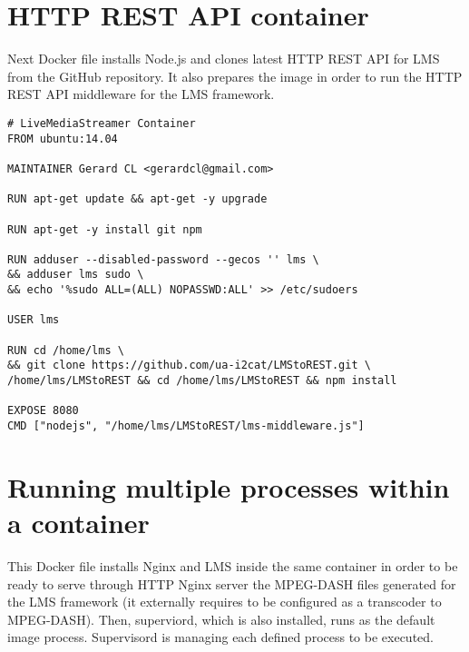 \section{HTTP REST API container}\label{ANX:dockerFiles2}

Next Docker file installs Node.js and clones latest HTTP REST API for LMS from the GitHub repository. It also prepares the image in order to run the HTTP REST API middleware for the LMS framework.

\begin{verbatim}
# LiveMediaStreamer Container
FROM ubuntu:14.04

MAINTAINER Gerard CL <gerardcl@gmail.com>

RUN apt-get update && apt-get -y upgrade

RUN apt-get -y install git npm

RUN adduser --disabled-password --gecos '' lms \
&& adduser lms sudo \
&& echo '%sudo ALL=(ALL) NOPASSWD:ALL' >> /etc/sudoers

USER lms

RUN cd /home/lms \
&& git clone https://github.com/ua-i2cat/LMStoREST.git \
/home/lms/LMStoREST && cd /home/lms/LMStoREST && npm install

EXPOSE 8080
CMD ["nodejs", "/home/lms/LMStoREST/lms-middleware.js"]
\end{verbatim}

\section{Running multiple processes within a container}\label{ANX:dockerFiles3}

This Docker file installs Nginx and LMS inside the same container in order to be ready to serve through HTTP Nginx server the MPEG-DASH files generated for the LMS framework (it externally requires to be configured as a transcoder to MPEG-DASH). Then, superviord, which is also installed, runs as the default image process. Supervisord is managing each defined process to be executed.  

